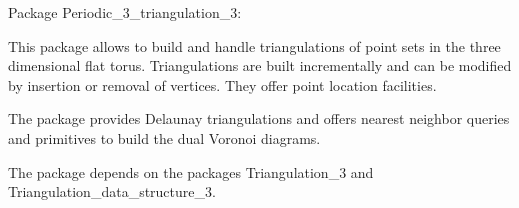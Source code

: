 Package Periodic_3_triangulation_3:

This package allows to build and handle triangulations of point sets
in the three dimensional flat torus. Triangulations are built
incrementally and can be modified by insertion or removal of
vertices. They offer point location facilities.

The package provides Delaunay triangulations and offers nearest
neighbor queries and primitives to build the dual Voronoi diagrams.

The package depends on the packages Triangulation_3 and
Triangulation_data_structure_3.
